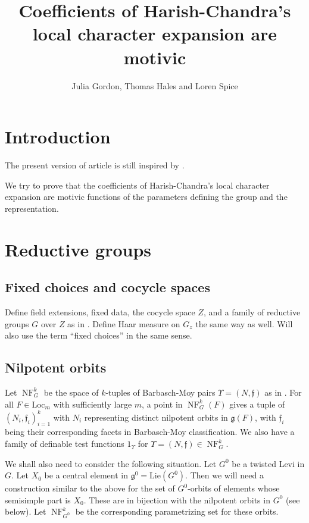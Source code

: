 \documentclass[12pt]{amsart}
\title{Coefficients of Harish-Chandra's local character expansion are motivic}
\author{Julia Gordon, Thomas Hales and Loren Spice}
\newcommand{\fg}{\mathfrak{g}}
\newcommand{\ff}{\mathfrak{f}}
\newcommand{\Loc}{\mathrm{Loc}}
\def\Lie{\mathrm{Lie}}
\newcommand{\op}[1]{\operatorname{#1}}
\newcommand{\NF}{\op{NF}}
\theoremstyle{plain}
\theoremstyle{definition}
\begin{document}

\maketitle

\section{Introduction}
The present version of article is still inspired by \cite{unsuccessful self-treatment of writer's block}. 
 
We try to prove that the coefficients of Harish-Chandra's local character expansion are motivic functions of the parameters defining the group and the representation. 

\section{Reductive groups}
\subsection{Fixed choices and cocycle spaces}
Define field extensions, fixed data, the cocycle space $Z$, and a family of reductive groups $G$ over $Z$ as in \cite{transfer transfer}. Define Haar measure on $G_z$ the same way as well.
Will also use the term ``fixed choices'' in the same sense. 

\subsection{Nilpotent orbits} Let $\NF_G^k$ be the space of 
$k$-tuples of Barbasch-Moy pairs $\Upsilon=(N, \ff)$ as in  \cite{transfertransfer}. 
For all $F\in \Loc_m$ with sufficiently large $m$, 
a point in $\NF_G^k(F)$ gives a tuple of $(N_i, \ff_i)_{i=1}^k$ with $N_i$ representing distinct nilpotent orbits in $\fg(F)$, with $\ff_i$ being their corresponding facets in Barbasch-Moy classification. We also have a family of definable test functions $1_{\Upsilon}$ for 
$\Upsilon=(N, \ff)\in \NF_G^k$. 

We shall also need to consider the following situation. 
Let $G^0$ be a twisted Levi in $G$. 
Let $X_0$ be a central element in $\fg^0=\Lie(G^0)$. 
Then we will need a construction similar to the above for the set of $G^0$-orbits of elements whose semisimple part is $X_0$. These are in bijection with the nilpotent orbits in $G^0$ (see below). 
Let $\NF_{G^0}^k$ be the corresponding parametrizing set for these orbits. 
\end{document}
